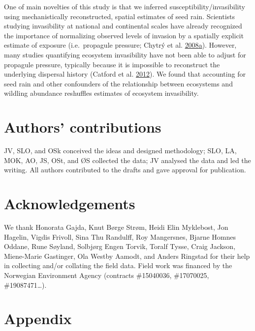 \documentclass[
]{article}
\begin{document}
One of main novelties of this study is that we inferred susceptibility/invasibility using mechanistically reconstructed, spatial estimates of seed rain.
Scientists studying invasibility at national and continental scales have already recognized the importance of normalizing observed levels of invasion by a spatially explicit estimate of exposure (i.e.~propagule pressure; Chytrý et al. \protect\hyperlink{ref-chytrySeparatingHabitatInvasibility2008}{2008}\protect\hyperlink{ref-chytrySeparatingHabitatInvasibility2008}{a}).
However, many studies quantifying ecosystem invasibility have not been able to adjust for propagule pressure, typically because it is impossible to reconstruct the underlying dispersal history (Catford et al. \protect\hyperlink{ref-catfordQuantifyingLevelsBiological2012}{2012}).
We found that accounting for seed rain and other confounders of the relationship between ecosystems and wildling abundance reshuffles estimates of ecosystem invasibility.

\hypertarget{authors-contributions}{%
\section{Authors' contributions}\label{authors-contributions}}

JV, SLO, and OSk conceived the ideas and designed methodology; SLO, LA, MOK, AO, JS, OSt, and ØS collected the data; JV analysed the data and led the writing. All authors contributed to the drafts and gave approval for publication.

\hypertarget{acknowledgements}{%
\section{Acknowledgements}\label{acknowledgements}}

We thank Honorata Gajda, Knut Børge Strøm, Heidi Elin Myklebost, Jon Hagelin, Vigdis Frivoll, Sina Thu Randulff, Roy Mangersnes, Bjarne Homnes Oddane, Rune Søyland, Solbjørg Engen Torvik, Toralf Tysse, Craig Jackson, Miene-Marie Gastinger, Ola Westby Aamodt, and Anders Ringstad for their help in collecting and/or collating the field data. Field work was financed by the Norwegian Environment Agency (contracts \#15040036, \#17070025, \#19087471\ldots).

\hypertarget{appendix}{%
\section{Appendix}\label{appendix}}
\end{document}
